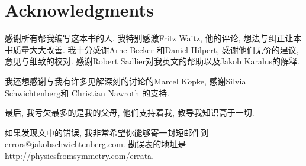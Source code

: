 
\chapter*{Acknowledgments}
感谢所有帮我编写这本书的人. 我特别感激Fritz Waitz, 他的评论, 想法与纠正让本书质量大大改善. 我十分感谢Arne Becker 和Daniel Hilpert, 感谢他们无价的建议,意见与细致的校对. 感谢Robert Sadlier对我英文的帮助以及Jakob Karalus的解释.

我还想感谢与我有许多见解深刻的讨论的Marcel K$\ddot{o}$pke, 感谢Silvia Schwichtenberg和 Christian Nawroth 的支持.

最后, 我亏欠最多的是我的父母, 他们支持着我, 教导我知识高于一切.

如果发现文中的错误, 我非常希望你能够寄一封短邮件到 errors@jakobschwichtenberg.com. 勘误表的地址是\url{http://physicsfromsymmetry.com/errata}.
